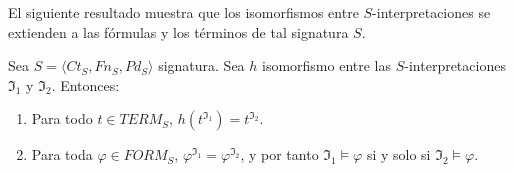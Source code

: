 El siguiente resultado muestra que los isomorfismos entre $S$-interpretaciones se extienden a las fórmulas y los términos de tal signatura $S$.

\begin{theorem}
Sea $S = \langle Ct_{S}, Fn_{S}, Pd_{S}\rangle$ signatura. Sea $h$ isomorfismo entre las $S$-interpretaciones $\mathfrak{I}_1$ y $\mathfrak{I}_2$. Entonces:
\begin{enumerate}
    \item Para todo $t \in TERM_S$, $h(t^{\mathfrak{I}_1}) = t^{\mathfrak{I}_2}$.
    \item Para toda $\varphi \in FORM_S$, $\varphi^{\mathfrak{I}_1} = \varphi^{\mathfrak{I}_2}$, y por tanto $\mathfrak{I}_1 \vDash \varphi$ si y solo si $\mathfrak{I}_2 \vDash \varphi$.
\end{enumerate}
\end{theorem}
